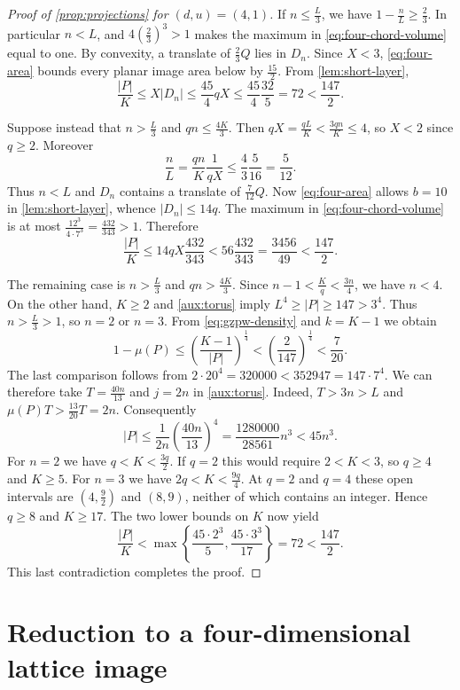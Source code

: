 \documentclass[reqno, 11pt]{article}
\numberwithin{equation}{section}
\theoremstyle{definition}
\begin{document}
\begin{proof}[Proof of \cref{prop:projections} for $(d,u)=(4,1)$]
If $n\le\frac{L}{3}$, we have $1-\frac{n}{L}\ge\frac{2}{3}$.
In particular $n<L$, and $4(\frac{2}{3})^3>1$ makes the maximum
in \eqref{eq:four-chord-volume} equal to one. By convexity, a
translate of $\frac{2}{3}Q$ lies in $D_n$. Since $X<3$,
\eqref{eq:four-area} bounds every planar image area below by
$\frac{15}{2}$. From \cref{lem:short-layer},
\[
         \frac{|P|}{K}\le X|D_n|\le \frac{45}{4}qX
               \le \frac{45}{4}\frac{32}{5}=72<\frac{147}{2}.
\]

Suppose instead that $n>\frac{L}{3}$ and $qn\le\frac{4K}{3}$.
Then $qX=\frac{qL}{K}<\frac{3qn}{K}\le4$, so $X<2$ since $q\ge2$.
Moreover
\[
 \frac{n}{L}=\frac{qn}{K}\frac{1}{qX}
       \le\frac{4}{3}\frac{5}{16}=\frac{5}{12}.
\]
Thus $n<L$ and $D_n$ contains a translate of $\frac{7}{12}Q$.
Now \eqref{eq:four-area} allows $b=10$ in \cref{lem:short-layer},
whence $|D_n|\le14q$. The maximum in \eqref{eq:four-chord-volume}
is at most $\frac{12^3}{4\cdot7^3}=\frac{432}{343}>1$. Therefore
\[
        \frac{|P|}{K}\le14qX\frac{432}{343}
          <56\frac{432}{343}=\frac{3456}{49}<\frac{147}{2}.
\]

The remaining case is $n>\frac{L}{3}$ and $qn>\frac{4K}{3}$.
Since $n-1<\frac{K}{q}<\frac{3n}{4}$, we have $n<4$. On the
other hand, $K\ge2$ and \cref{aux:torus} imply
$L^4\ge|P|\ge147>3^4$. Thus $n>\frac{L}{3}>1$, so $n=2$ or $n=3$.
From \eqref{eq:gzpw-density} and $k=K-1$ we obtain
\[
 1-\mu(P)\le\left(\frac{K-1}{|P|}\right)^{\frac{1}{4}}
       <\left(\frac{2}{147}\right)^{\frac{1}{4}}<\frac{7}{20}.
\]
The last comparison follows from $2\cdot20^4=320000
<352947=147\cdot7^4$. We can therefore take $T=\frac{40n}{13}$ and
$j=2n$ in \cref{aux:torus}. Indeed, $T>3n>L$ and
$\mu(P)T>\frac{13}{20}T=2n$. Consequently
\[
 |P|\le\frac{1}{2n}\left(\frac{40n}{13}\right)^4
     =\frac{1280000}{28561}n^3<45n^3 .
\]
For $n=2$ we have $q<K<\frac{3q}{2}$. If $q=2$ this would require
$2<K<3$, so $q\ge4$ and $K\ge5$. For $n=3$ we have
$2q<K<\frac{9q}{4}$. At $q=2$ and $q=4$ these open intervals are
$(4,\frac{9}{2})$ and $(8,9)$, neither of which contains an integer.
Hence $q\ge8$ and $K\ge17$. The two lower bounds on $K$ now yield
\[
 \frac{|P|}{K}<
 \max\left\{\frac{45\cdot2^3}{5},\frac{45\cdot3^3}{17}\right\}
 =72<\frac{147}{2}.
\]
This last contradiction completes the proof.
\end{proof}

\section{Reduction to a four-dimensional lattice image}\label{sec:gzpw-wide}
\end{document}
